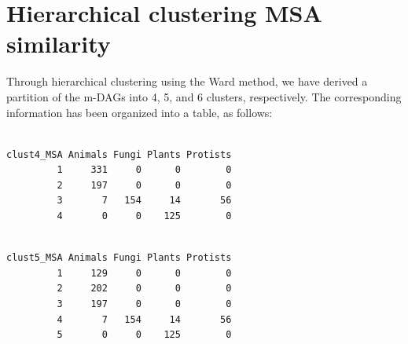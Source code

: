 \documentclass[
  letterpaper,
  DIV=11,
  numbers=noendperiod]{scrreprt}
\newenvironment{Shaded}{}{}
\newcommand{\AttributeTok}[1]{\textcolor[rgb]{0.78,0.47,0.87}{#1}}
\newcommand{\DecValTok}[1]{\textcolor[rgb]{0.82,0.60,0.40}{#1}}
\newcommand{\FunctionTok}[1]{\textcolor[rgb]{0.38,0.69,0.94}{#1}}
\newcommand{\NormalTok}[1]{\textcolor[rgb]{0.67,0.70,0.75}{#1}}
\newcommand{\OtherTok}[1]{\textcolor[rgb]{0.15,0.68,0.38}{#1}}
\newcommand{\SpecialCharTok}[1]{\textcolor[rgb]{0.34,0.71,0.76}{#1}}
\newcommand{\StringTok}[1]{\textcolor[rgb]{0.60,0.76,0.47}{#1}}
\begin{document}
\hypertarget{hierarchical-clustering-msa-similarity}{%
\section{Hierarchical clustering MSA
similarity}\label{hierarchical-clustering-msa-similarity}}

Through hierarchical clustering using the Ward method, we have derived a
partition of the m-DAGs into 4, 5, and 6 clusters, respectively. The
corresponding information has been organized into a table, as follows:

\begin{Shaded}
\end{Shaded}

\begin{verbatim}
          
clust4_MSA Animals Fungi Plants Protists
         1     331     0      0        0
         2     197     0      0        0
         3       7   154     14       56
         4       0     0    125        0
\end{verbatim}

\begin{Shaded}
\end{Shaded}

\begin{verbatim}
          
clust5_MSA Animals Fungi Plants Protists
         1     129     0      0        0
         2     202     0      0        0
         3     197     0      0        0
         4       7   154     14       56
         5       0     0    125        0
\end{verbatim}
\end{document}
